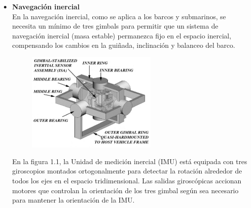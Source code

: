 \begin{itemize}
	\item \textbf{Navegación inercial}\\
	      En la navegación inercial, como se aplica a los barcos y submarinos, se necesita
	      un mínimo de tres gimbals para permitir que un sistema de navegación inercial
	      (masa estable) permanezca fijo en el espacio inercial, compensando los cambios
	      en la guiñada, inclinación y balanceo del barco.
	      \begin{figure}[htb]
		      \centering
		      \includegraphics[width=0.6\textwidth]{Contenido/Cuerpo/Capitulo1/Fig1.eps}
		      \label{fig:Introduccion:Fig2}
	      \end{figure}

	      En la figura 1.1, la Unidad de medición inercial (IMU) está equipada con tres
	      giroscopios montados ortogonalmente para detectar la rotación alrededor de todos
	      los ejes en el espacio tridimensional. Las salidas giroscópicas accionan motores
	      que controlan la orientación de los tres gimbal según sea necesario para mantener
	      la orientación de la IMU.


\end{itemize}
